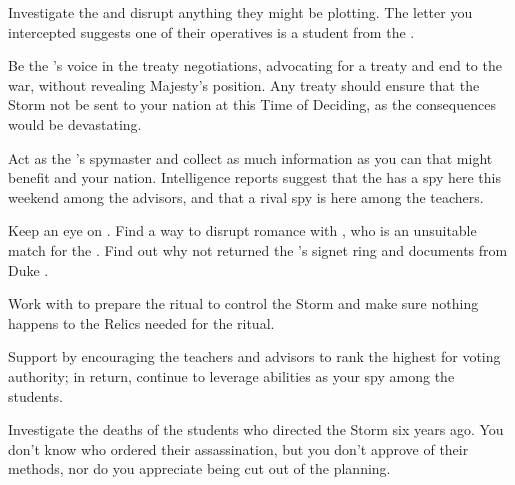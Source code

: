 \documentclass[char]{GL2020}
\begin{document}
\begin{itemz}
	\item Investigate the \pGoaties{} and disrupt anything they might be plotting. The letter you intercepted suggests one of their operatives is a student from the \pFarm{}.
	\item Be the \cQueen{\Majesty}'s voice in the treaty negotiations, advocating for a treaty and end to the war, without revealing \cQueen{\Their} Majesty's position. Any treaty should ensure that the Storm not be sent to your nation at this Time of Deciding, as the consequences would be devastating.
	\item Act as the \cQueen{\Majesty}'s spymaster and collect as much information as you can that might benefit \cQueen{\them} and your nation. Intelligence reports suggest that the \pTech{} has a spy here this weekend among the advisors, and that a rival \pFarm{} spy is here among the teachers.
	\item Keep an eye on \cPrince{}. Find a way to disrupt \cPrince{\their} romance with \cPirate{}, who is an unsuitable match for the \cPrince{\heir}. Find out why \cPrince{\they} \cPrince{\have} not returned the \cQueen{\Majesty}'s signet ring and documents from Duke \cChupStudent{\formal}.
	\item Work with \cLibrarian{} to prepare the ritual to control the Storm and make sure nothing happens to the Relics needed for the ritual.
	\item Support \cLibAssist{} by encouraging the \pTech{} teachers and \pFarm{} advisors to rank \cLibAssist{\them} the highest for voting authority; in return, continue to leverage \cLibAssist{\their} abilities as your spy among the students.
	\item Investigate the deaths of the students who directed the Storm six years ago. You don't know who ordered their assassination, but you don't approve of their methods, nor do you appreciate being cut out of the planning.
\end{itemz}
\end{document}
